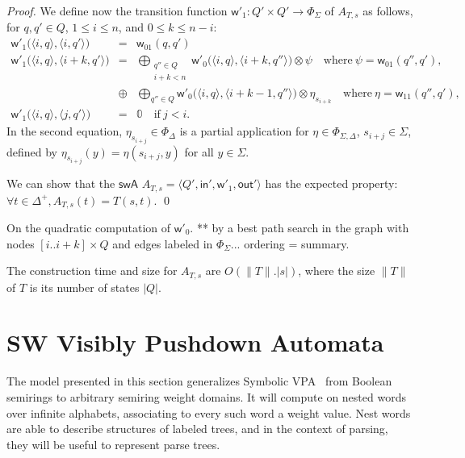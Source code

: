 \documentclass[runningheads]{llncs}
\def\<#1>{\langle #1 \rangle}
\newcommand{\zero}{\mathbb{0}}
\def\SWA{\textsf{swA}\xspace}
\def\wei{\mathsf{w}}
\def\init{\mathsf{in}}
\def\final{\mathsf{out}}
\begin{document}
\begin{proof}
\noindent
We define now the transition function 
$\wei'_1: Q' \times Q' \to \Phi_\Sigma$
of $A_{T, s}$ as follows,
for $q, q' \in Q$,
$1 \leq i \leq n$, and $0 \leq k \leq n-i$:
\[
\begin{array}{lcl}
\wei'_1\bigl(\< i, q>, \< i, q'>\bigr) & = & \wei_{01}(q, q')\\
%
\wei'_1\bigl(\< i, q>, \< i+k, q'>\bigr) & = & 
\displaystyle
\bigoplus_{\begin{array}{c}
           \scriptstyle q'' \in Q\\[-2pt]
           \scriptstyle i+k < n
           \end{array}} 
\wei'_0\bigl(\<i, q>, \< i+k, q''>\bigr) \otimes \psi %
\quad \mathrm{where~} \psi = \wei_{01}(q'', q'),\\
 & \oplus & \displaystyle
\bigoplus_{q'' \in Q} \wei'_0\bigl(\<i, q>, \< i+k-1, q''>\bigr) \otimes \eta_{s_{i+k}}
\quad \mathrm{where~}\eta = \wei_{11}(q'', q'),\\
%
\wei'_1\bigl(\< i, q>, \< j, q'>\bigr) & = & \zero  
\quad \mathrm{if~} j < i.
\end{array}      
\]
%
In the second equation, 
$\eta_{s_{i+j}} \in \Phi_{\Delta}$ is a partial application 
for $\eta \in \Phi_{\Sigma, \Delta}$, $s_{i+j} \in \Sigma$, 
defined by $\eta_{s_{i+j}}(y) = \eta(s_{i+j}, y)$ for all $y \in \Sigma$.

\noindent
We can show that the $\SWA$ $A_{T, s} = \< Q', \init', \wei'_1, \final' >$
has the expected property: $\forall t \in \Delta^+, A_{T, s}(t) = T(s, t)$.
\qed
\end{proof}

\noindent
On the quadratic computation of $\wei'_0$. **
by a best path search in the graph with nodes $[i..i+k] \times Q$
and edges labeled in $\Phi_\Sigma$...
ordering = summary.


\noindent
The construction time and size for $A_{T, s}$ are $O(\| T \| . | s |)$,
where the size $\| T \|$ of $T$ is its number of states $|Q|$.

 







\section{SW Visibly Pushdown Automata}
\label{section:SWVPA}\label{sec:SWVPA}
The model presented in this section generalizes Symbolic VPA~\cite{dAntonyAlur14SVPDA}
from Boolean semirings to arbitrary semiring weight domains.
It will compute on nested words over infinite alphabets, 
associating to every such word a weight value. 
Nest words are able to describe structures of labeled trees, 
and in the context of parsing, they will be useful to 
represent parse trees.
\end{document}
